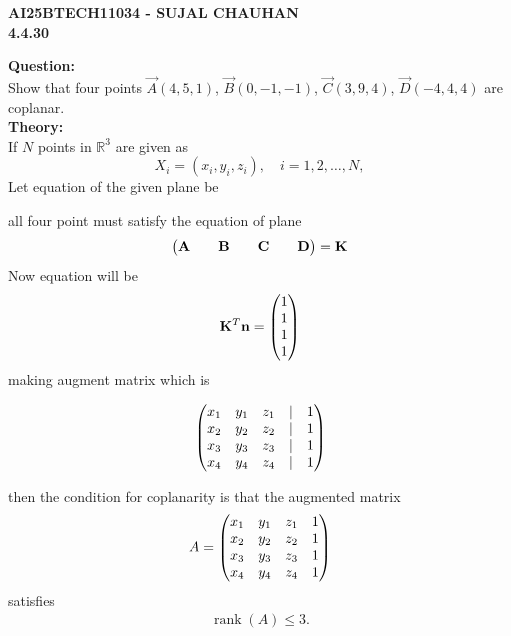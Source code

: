 \documentclass[12pt]{article}
\begin{document}
\newpage
\begin{center}
\textbf{\Large AI25BTECH11034 - SUJAL CHAUHAN }\\
\textbf{4.4.30}
\end{center}

\textbf{Question:}\\
Show that four points $\vec{A}(4,5,1)$, $\vec{B}(0,-1,-1)$, $\vec{C}(3,9,4)$, $\vec{D}(-4,4,4)$ are coplanar.\\[1cm]

\textbf{Theory:} \\

If $N$ points in $\mathbb{R}^3$ are given as 
\[
X_i = (x_i, y_i, z_i), \quad i = 1,2,\dots,N,
\] 
Let equation of the given plane be 

all four point must satisfy the equation of plane 
\begin{align}
\begin{pmatrix}\mathbf{A}&&\mathbf{B}&&\mathbf{C} && \mathbf{D}\end{pmatrix}=\mathbf{K}
\end{align}
Now equation will be 
\begin{align}
    \mathbf{K}^T\mathbf{n}=\begin{pmatrix}1 \\ 1\\ 1\\ 1\end{pmatrix}
\end{align}
making augment matrix which is 

    \begin{align}
 \begin{pmatrix}
x_1 & y_1 & z_1 & | & 1 \\
x_2 & y_2 & z_2 & | & 1 \\
x_3 & y_3 & z_3 & | & 1 \\
x_4 & y_4 & z_4 & | & 1
\end{pmatrix} 
\end{align}


then the condition for coplanarity is that the augmented matrix
\begin{align}
A = \begin{pmatrix}
x_1 & y_1 & z_1 & 1 \\
x_2 & y_2 & z_2 & 1 \\
x_3& y_3 & z_3 & 1 \\
x_4 & y_4 & z_4 & 1
\end{pmatrix}
\end{align}
satisfies
\begin{align}
\operatorname{rank}(A) \leq 3.
\end{align}
\end{document}
